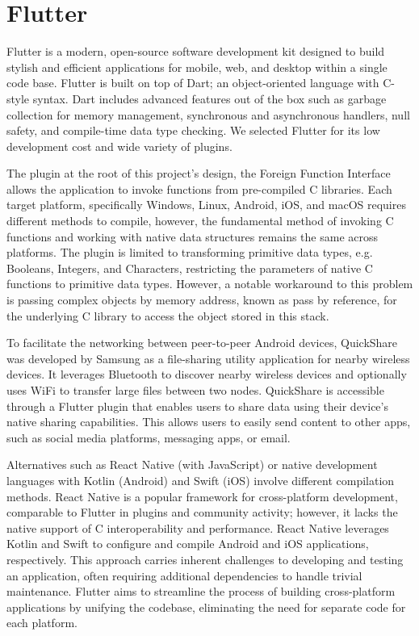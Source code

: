 \section{Flutter}
\label{sec:Background Flutter}
Flutter is a modern, open-source software development kit designed to build stylish and efficient applications for mobile, web, and desktop within a single code base. Flutter is built on top of Dart; an object-oriented language with C-style syntax. Dart includes advanced features out of the box such as garbage collection for memory management, synchronous and asynchronous handlers, null safety, and compile-time data type checking. We selected Flutter for its low development cost and wide variety of plugins.

The plugin at the root of this project's design, the Foreign Function Interface allows the application to invoke functions from pre-compiled C libraries. Each target platform, specifically Windows, Linux, Android, iOS, and macOS requires different methods to compile, however, the fundamental method of invoking C functions and working with native data structures remains the same across platforms. The plugin is limited to transforming primitive data types, e.g. Booleans, Integers, and Characters, restricting the parameters of native C functions to primitive data types. However, a notable workaround to this problem is passing complex objects by memory address, known as pass by reference, for the underlying C library to access the object stored in this stack. 

To facilitate the networking between peer-to-peer Android devices, QuickShare \cite{samsung_quick_2020} was developed by Samsung as a file-sharing utility application for nearby wireless devices. It leverages Bluetooth to discover nearby wireless devices and optionally uses WiFi to transfer large files between two nodes. QuickShare is accessible through a Flutter plugin that enables users to share data using their device's native sharing capabilities. This allows users to easily send content to other apps, such as social media platforms, messaging apps, or email.

Alternatives such as React Native (with JavaScript) or native development languages with Kotlin (Android) and Swift (iOS) involve different compilation methods. React Native is a popular framework for cross-platform development, comparable to Flutter in plugins and community activity; however, it lacks the native support of C interoperability and performance. React Native leverages Kotlin and Swift to configure and compile Android and iOS applications, respectively. This approach carries inherent challenges to developing and testing an application, often requiring additional dependencies to handle trivial maintenance. Flutter aims to streamline the process of building cross-platform applications by unifying the codebase, eliminating the need for separate code for each platform. 
